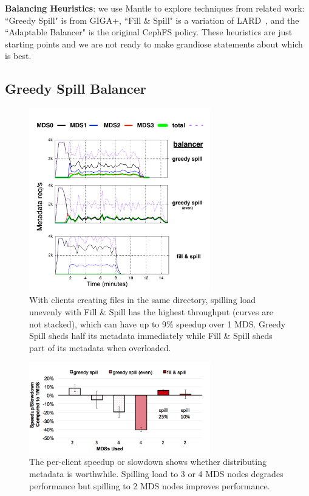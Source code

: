 \textbf{Balancing Heuristics}: we use Mantle to explore techniques from related work: ``Greedy Spill" is from GIGA+, ``Fill \& Spill" is a variation of LARD~\cite{pai:asplos1998}, and the ``Adaptable Balancer" is the original CephFS policy. These heuristics are just starting points and we are not ready to make grandiose statements about which is best. 

\subsection{Greedy Spill Balancer}
\label{greedy-spill-balancer}
\begin{figure}[tbh]
	\centering	
   	\includegraphics[width=0.7\textwidth]{./chapters/mantle/figures/spill-evenly.pdf}
	\caption{With clients creating files in the same directory, spilling load unevenly with Fill \& Spill has the highest throughput (curves are not stacked), which can have up to 9\% speedup over 1 MDS. Greedy Spill sheds half its metadata immediately while Fill \& Spill sheds part of its metadata when overloaded.\label{figure:eval_spill-evenly}}
\end{figure}
\begin{figure}[tbh]
	\centering	
	\includegraphics[width=0.7\textwidth]{./chapters/mantle/figures/eval_spill-evenly_bar}
	\caption{The per-client speedup or slowdown shows whether distributing metadata is worthwhile.  Spilling load to 3 or 4 MDS nodes degrades performance but spilling to 2 MDS nodes improves performance.\label{figure:eval_spill-evenly_bar}}
\end{figure}

